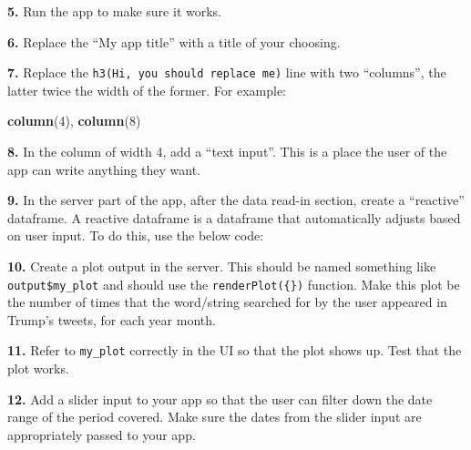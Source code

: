 \documentclass[]{book}
\newenvironment{Shaded}{\begin{snugshade}}{\end{snugshade}}
\newcommand{\CommentTok}[1]{\textcolor[rgb]{0.56,0.35,0.01}{\textit{#1}}}
\newcommand{\DecValTok}[1]{\textcolor[rgb]{0.00,0.00,0.81}{#1}}
\newcommand{\KeywordTok}[1]{\textcolor[rgb]{0.13,0.29,0.53}{\textbf{#1}}}
\newcommand{\NormalTok}[1]{#1}
\newcommand{\OperatorTok}[1]{\textcolor[rgb]{0.81,0.36,0.00}{\textbf{#1}}}
\newcommand{\StringTok}[1]{\textcolor[rgb]{0.31,0.60,0.02}{#1}}
\begin{document}
\textbf{5.} Run the app to make sure it works.

\textbf{6.} Replace the ``My app title'' with a title of your choosing.

\textbf{7.} Replace the \texttt{h3(\textquotesingle{}Hi,\ you\ should\ replace\ me\textquotesingle{})} line with two ``columns'', the latter twice the width of the former. For example:

\begin{Shaded}
\begin{Highlighting}[]
\KeywordTok{column}\NormalTok{(}\DecValTok{4}\NormalTok{),}
\KeywordTok{column}\NormalTok{(}\DecValTok{8}\NormalTok{)}
\end{Highlighting}
\end{Shaded}

\textbf{8.} In the column of width 4, add a ``text input''. This is a place the user of the app can write anything they want.

\textbf{9.} In the server part of the app, after the data read-in section, create a ``reactive'' dataframe. A reactive dataframe is a dataframe that automatically adjusts based on user input. To do this, use the below code:

\begin{Shaded}
\end{Shaded}

\textbf{10.} Create a plot output in the server. This should be named something like \texttt{output\$my\_plot} and should use the \texttt{renderPlot(\{\})} function. Make this plot be the number of times that the word/string searched for by the user appeared in Trump's tweets, for each year month.

\textbf{11.} Refer to \texttt{my\_plot} correctly in the UI so that the plot shows up. Test that the plot works.

\textbf{12.} Add a slider input to your app so that the user can filter down the date range of the period covered. Make sure the dates from the slider input are appropriately passed to your app.
\end{document}
